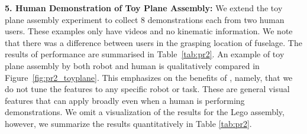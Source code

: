 \documentclass[0-main.tex]{subfiles}
\begin{document}
\vspace{5pt}
\noindent \textbf{5. Human Demonstration of Toy Plane Assembly: }
We extend the toy plane assembly experiment to collect 8 demonstrations each from two human users. These examples only have videos and no kinematic information. We note that there was a difference between users in the grasping location of fuselage. 
The results of \tsc performance are summarised in Table~\ref{tab:pr2}.
An example of toy plane assembly by both robot and human is qualitatively compared in Figure~\ref{fig:pr2_toyplane}. 
This emphasizes on the benefits of \tsc, namely, that we do not tune the features to any specific robot or task. 
These are general visual features that can apply broadly even when a human is performing demonstrations.
We omit a visualization of the results for the Lego assembly, however, we summarize the results quantitatively in Table \ref{tab:pr2}.

\end{document}
